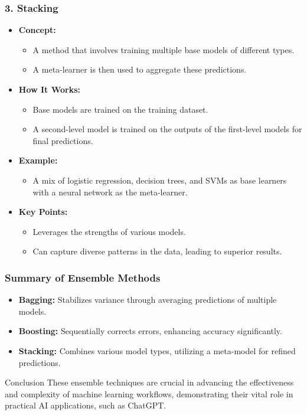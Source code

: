 \documentclass[aspectratio=169]{beamer}
\begin{document}
\begin{frame}[fragile]
    \frametitle{3. Stacking}
    \begin{itemize}
        \item \textbf{Concept:}
        \begin{itemize}
            \item A method that involves training multiple base models of different types.
            \item A meta-learner is then used to aggregate these predictions.
        \end{itemize}
        
        \item \textbf{How It Works:}
        \begin{itemize}
            \item Base models are trained on the training dataset.
            \item A second-level model is trained on the outputs of the first-level models for final predictions.
        \end{itemize}
        
        \item \textbf{Example:}
        \begin{itemize}
            \item A mix of logistic regression, decision trees, and SVMs as base learners with a neural network as the meta-learner.
        \end{itemize}

        \item \textbf{Key Points:}
        \begin{itemize}
            \item Leverages the strengths of various models.
            \item Can capture diverse patterns in the data, leading to superior results.
        \end{itemize}
    \end{itemize}
\end{frame}

\begin{frame}[fragile]
    \frametitle{Summary of Ensemble Methods}
    \begin{itemize}
        \item \textbf{Bagging:} Stabilizes variance through averaging predictions of multiple models.
        \item \textbf{Boosting:} Sequentially corrects errors, enhancing accuracy significantly.
        \item \textbf{Stacking:} Combines various model types, utilizing a meta-model for refined predictions.
    \end{itemize}
    \begin{block}{Conclusion}
        These ensemble techniques are crucial in advancing the effectiveness and complexity of machine learning workflows, demonstrating their vital role in practical AI applications, such as ChatGPT.
    \end{block}
\end{frame}
\end{document}
